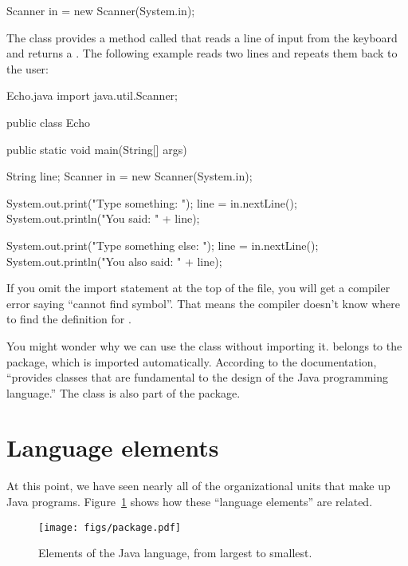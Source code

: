\begin{code}
Scanner in = new Scanner(System.in);
\end{code}

The  class provides a method called  that reads a line of input from the keyboard and returns a .
The following example reads two lines and repeats them back to the user:


\begin{trinket}{Echo.java}
import java.util.Scanner;

public class Echo {

    public static void main(String[] args) {
        String line;
        Scanner in = new Scanner(System.in);

        System.out.print("Type something: ");
        line = in.nextLine();
        System.out.println("You said: " + line);

        System.out.print("Type something else: ");
        line = in.nextLine();
        System.out.println("You also said: " + line);
    }
}
\end{trinket}

If you omit the import statement at the top of the file, you will get a compiler error saying ``cannot find symbol''.
That means the compiler doesn't know where to find the definition for .


You might wonder why we can use the  class without importing it.
 belongs to the  package, which is imported automatically.
According to the documentation,  ``provides classes that are fundamental to the design of the Java programming language.''
The  class is also part of the  package.


\section{Language elements}


At this point, we have seen nearly all of the organizational units that make up Java programs.
Figure~\ref{fig.package} shows how these ``language elements'' are related.

\begin{figure}[!ht]
\begin{center}
\texttt{[image: figs/package.pdf]}
\caption{Elements of the Java language, from largest to smallest.}
\label{fig.package}
\end{center}
\end{figure}

